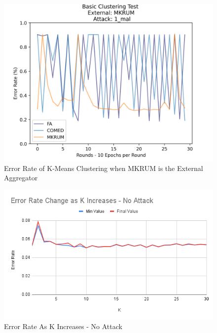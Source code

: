 \begin{figure}[htbp]
	\centering
    \includegraphics[scale=0.5]{my_agg/graphs/cluster_mkrum_1.png}
	\caption{Error Rate of K-Means Clustering when MKRUM is the External Aggregator}
	\label{fig:mkrum_bad}
\end{figure}

\begin{figure}[htbp]
	\centering
    \includegraphics[scale=0.5]{my_agg/graphs/k_elbow_0.png}
	\caption{Error Rate As K Increases - No Attack}
	\label{fig:k_elbow_0}
\end{figure}

